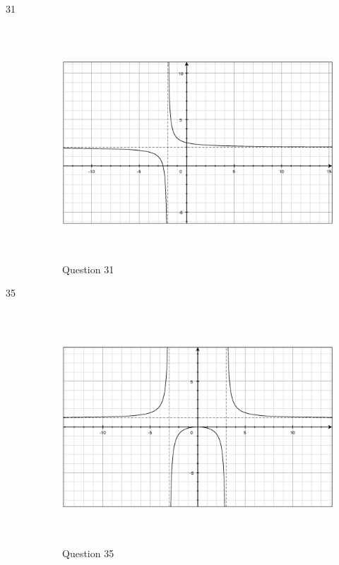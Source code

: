 \documentclass[fleqn,addpoints]{exam}
\begin{document}
\begin{description}
\item[31]
\begin{figure}[H]
  \centering
  \includegraphics[width=12.25cm,height=8.75cm]{question31.eps}
  \caption*{Question 31}
\end{figure}

\item[35]
\begin{figure}[H]
  \centering
  \includegraphics[width=12.25cm,height=8.75cm]{question35.eps}
  \caption*{Question 35}
\end{figure}


\end{description}
\end{document}
